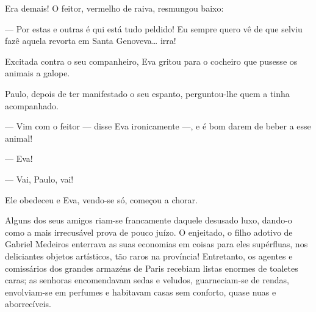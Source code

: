 {

Era demais! O feitor, vermelho de raiva, resmungou baixo:

--- Por estas e outras é qui está tudo peldido! Eu sempre
quero vê de que selviu fazê aquela revorta em Santa
Genoveva\ldots{} irra!

Excitada contra o seu companheiro, Eva gritou para o cocheiro
que pusesse os animais a galope.


Paulo, depois de ter manifestado o seu espanto, perguntou-lhe
quem a tinha acompanhado.

--- Vim com o feitor --- disse Eva ironicamente
---, e é bom darem de beber a esse animal!

--- Eva!

--- Vai, Paulo, vai!

Ele obedeceu e Eva, vendo-se só, começou a chorar.



Alguns dos seus amigos riam-se francamente daquele desusado
luxo, dando-o como a mais irrecusável prova de pouco juízo. O
enjeitado, o filho adotivo de Gabriel Medeiros enterrava as suas
economias em coisas para eles supérfluas, nos deliciantes
objetos artísticos, tão raros na província! Entretanto, os
agentes e comissários dos grandes armazéns de Paris recebiam listas
enormes de toaletes caras; as senhoras encomendavam sedas e
veludos, guarneciam-se de rendas, envolviam-se em perfumes e habitavam
casas sem conforto, quase nuas e
aborrecíveis.


}
